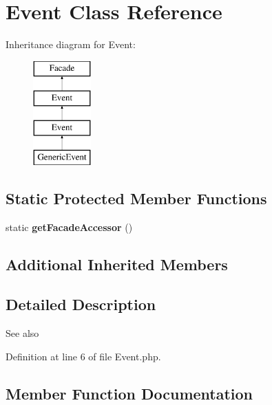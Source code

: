 \section{Event Class Reference}
\label{class_illuminate_1_1_support_1_1_facades_1_1_event}
Inheritance diagram for Event\+:\begin{figure}[H]
\begin{center}
\leavevmode
\includegraphics[height=4.000000cm]{class_illuminate_1_1_support_1_1_facades_1_1_event}
\end{center}
\end{figure}
\subsection*{Static Protected Member Functions}
\begin{DoxyCompactItemize}
\item 
static {\bf get\+Facade\+Accessor} ()
\end{DoxyCompactItemize}
\subsection*{Additional Inherited Members}


\subsection{Detailed Description}
\begin{DoxySeeAlso}{See also}

\end{DoxySeeAlso}


Definition at line 6 of file Event.\+php.



\subsection{Member Function Documentation}
